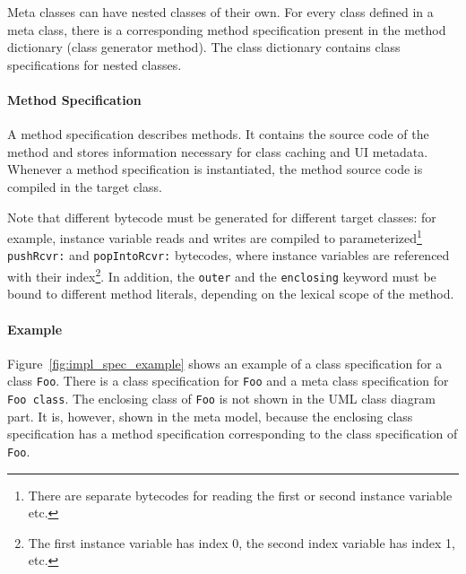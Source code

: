 Meta classes can have nested classes of their own. For every class defined in a meta class, there is a corresponding method specification present in the method dictionary (class generator method). The class dictionary contains class specifications for nested classes.

\paragraph{Method Specification}
A method specification describes methods. It contains the source code of the method and stores information necessary for class caching and UI metadata. Whenever a method specification is instantiated, the method source code is compiled in the target class. 

Note that different bytecode must be generated for different target classes: for example, instance variable reads and writes are compiled to parameterized\footnote{There are separate bytecodes for reading the first or second instance variable etc.} \texttt{pushRcvr:} and \texttt{popIntoRcvr:} bytecodes, where instance variables are referenced with their index\footnote{The first instance variable has index 0, the second index variable has index 1, etc.}. In addition, the \texttt{outer} and the \texttt{enclosing} keyword must be bound to different method literals, depending on the lexical scope of the method.

\paragraph{Example}
Figure~\ref{fig:impl_spec_example} shows an example of a class specification for a class \texttt{Foo}. There is a class specification for \texttt{Foo} and a meta class specification for \texttt{Foo class}. The enclosing class of \texttt{Foo} is not shown in the UML class diagram part. It is, however, shown in the meta model, because the enclosing class specification has a method specification corresponding to the class specification of \texttt{Foo}.

